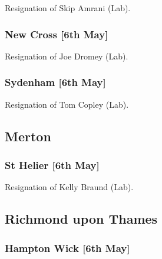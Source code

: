 \documentclass[a4paper,openany]{book}
\begin{document}
\begin{resultsiii}

Resignation of Skip Amrani (Lab).

\subsubsection*{New Cross \hspace*{\fill}\nolinebreak[1]%
	\enspace\hspace*{\fill}
	[6th May]}


Resignation of Joe Dromey (Lab).

\subsubsection*{Sydenham \hspace*{\fill}\nolinebreak[1]%
	\enspace\hspace*{\fill}
	[6th May]}


Resignation of Tom Copley (Lab).

\subsection*{Merton}

\subsubsection*{St Helier \hspace*{\fill}\nolinebreak[1]%
	\enspace\hspace*{\fill}
	[6th May]}


Resignation of Kelly Braund (Lab).

\subsection*{Richmond upon Thames}

\subsubsection*{Hampton Wick \hspace*{\fill}\nolinebreak[1]%
	\enspace\hspace*{\fill}
	[6th May]}


\end{resultsiii}
\end{document}
